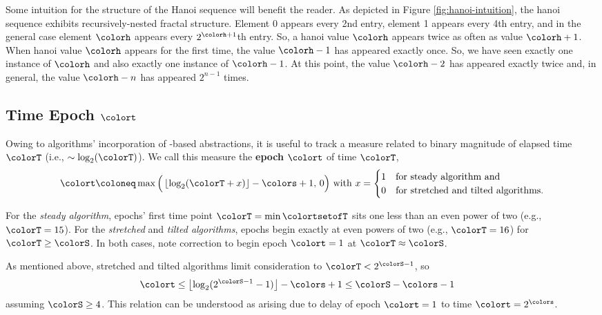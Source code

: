 Some intuition for the structure of the Hanoi sequence will benefit the reader.
As depicted in Figure \ref{fig:hanoi-intuition}, the hanoi sequence exhibits recursively-nested fractal structure.
Element 0 appears every 2nd entry, element 1 appears every 4th entry, and in the general case element $\colorh$ appears every $2^{\colorh+1}$th entry.
So, a hanoi value $\colorh$ appears twice as often as value $\colorh + 1$.
When hanoi value $\colorh$ appears for the first time, the value $\colorh - 1$ has appeared exactly once.
So, we have seen exactly one instance of $\colorh$ and also exactly one instance of $\colorh - 1$.
At this point, the value $\colorh - 2$ has appeared exactly twice and, in general, the value $\colorh - n$ has appeared $2^{n - 1}$ times.



\subsection{Time Epoch $\colort$}
\label{sec:notation-epoch}

Owing to algorithms' incorporation of \hv{}-based abstractions, it is useful to track a measure related to binary magnitude of elapsed time $\colorT$ (i.e., $\sim \log_2(\colorT)$).
We call this measure the \textbf{epoch} $\colort$ of time $\colorT$,
\begin{equation}
\colort
\coloneq
\max\Big(\left\lfloor \log_2(\colorT+x) \right\rfloor - \colors + 1,\, 0\Big)
\text{ with }
x =
\begin{cases}
1 & \text{for steady algorithm and} \\
0 & \text{for stretched and tilted algorithms.}
\end{cases}
\label{eqn:epoch-defn}
\end{equation}

For the \textit{steady algorithm}, epochs' first time point $\colorT = \min\colortsetofT$  sits one less than an even power of two (e.g.,  $\colorT = 15$).
For the \textit{stretched} and \textit{tilted algorithms}, epochs begin exactly at even powers of two (e.g., $\colorT = 16$) for $\colorT \geq \colorS$.
In both cases, note correction to begin epoch $\colort=1$ at $\colorT \approx \colorS$.

As mentioned above, stretched and tilted algorithms limit consideration to $\colorT < 2^{\colorS - 1}$, so
\begin{align*}
\colort &\leq \left\lfloor\log_2(2^{\colorS - 1} - 1)\right\rfloor - \colors + 1
\leq \colorS - \colors - 1
\end{align*}
assuming $\colorS \geq 4$.
This relation can be understood as arising due to delay of epoch $\colort=1$ to time $\colort=2^{\colors}$.


